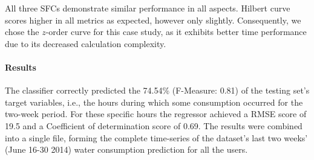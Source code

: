 \begin{table}[!ht]
\centering
\caption{Space Filling Curves' performance.}
\label{table2}
\begin{small}
\end{small}
\end{table}

All three SFCs demonstrate similar performance in all aspects. Hilbert curve scores higher in all metrics as expected, however only slightly. Consequently, we chose the $z$-order curve for this case study, as it exhibits better time performance due to its decreased calculation complexity.

\paragraph{Results}
\label{par:res1}
The classifier correctly predicted the 74.54\% (F-Measure: 0.81) of the testing set's target variables, i.e., the hours during which some consumption occurred for the two-week period. For these specific hours the regressor achieved a RMSE score of 19.5 and a Coefficient of determination score of 0.69. The results were combined into a single file, forming the complete time-series of the dataset's last two weeks' (June 16-30 2014) water consumption prediction for all the users. 

